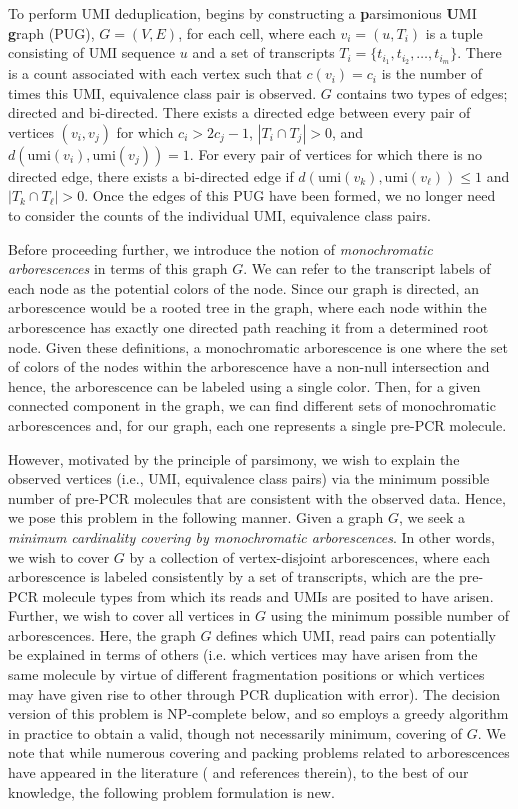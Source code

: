 To perform UMI deduplication, \alevin begins by constructing a \textbf{p}arsimonious \textbf{U}MI \textbf{g}raph (PUG), $G = (V, E)$, for each cell, where each $v_i = (u, T_i)$ is a tuple consisting of UMI sequence $u$ and a set of transcripts $T_i = \{t_{i_1}, t_{i_2}, \dots , t_{i_m}\}$.  There is a count associated with each vertex such that $c(v_i) = c_i$ is the number of times this UMI, equivalence class pair is observed. $G$ contains two types of edges; directed and bi-directed.  There exists a directed edge between every pair of vertices $(v_i, v_j)$ for which $c_i > 2c_j - 1$, $\left|T_i \cap T_j\right| > 0$, and $d(\text{umi}(v_i), \text{umi}(v_j)) = 1$.  For every pair of vertices for which there is no directed edge, there exists a bi-directed edge if $d(\text{umi}(v_k), \text{umi}(v_\ell)) \leq 1$ and $\left|T_k \cap T_\ell\right| > 0$.  Once the edges of this PUG have been formed, we no longer need to consider the counts of the individual UMI, equivalence class pairs.

Before proceeding further, we introduce the notion of \emph{monochromatic arborescences} in terms of this graph $G$. We can refer to the transcript labels of each node as the potential colors of the node. Since our graph is directed, an arborescence would be a rooted tree in the graph, where each node within the arborescence has exactly one directed path reaching it from a determined root node. Given these definitions, a monochromatic arborescence is one where the set of colors of the nodes within the arborescence have a non-null intersection and hence, the arborescence can be labeled using a single color. Then, for a given connected component in the graph, we can find different sets of monochromatic arborescences and, for our graph, each one represents a single pre-PCR molecule.

However, motivated by the principle of parsimony, we wish to explain the observed vertices (i.e., UMI, equivalence class pairs) via the minimum possible number of pre-PCR molecules that are consistent with the observed data. Hence, we pose this problem in the following manner.  Given a graph $G$, we seek a \emph{minimum cardinality covering by monochromatic arborescences}.  In other words, we wish to cover $G$ by a collection of vertex-disjoint arborescences, where each arborescence is labeled consistently by a set of transcripts, which are the pre-PCR molecule types from which its reads and UMIs are posited to have arisen.  Further, we wish to cover all vertices in $G$ using the minimum possible number of arborescences.  Here, the graph $G$ defines which UMI, read pairs can potentially be explained in terms of others (i.e. which vertices may have arisen from the same molecule by virtue of different fragmentation positions or which vertices may have given rise to other through PCR duplication with error).  The decision version of this problem is NP-complete below, and so \alevin employs a greedy algorithm in practice to obtain a valid, though not necessarily minimum, covering of $G$. We note that while numerous covering and packing problems related to arborescences have appeared in the literature (\citet{mincostarb} and references therein), to the best of our knowledge, the following problem formulation is new.

